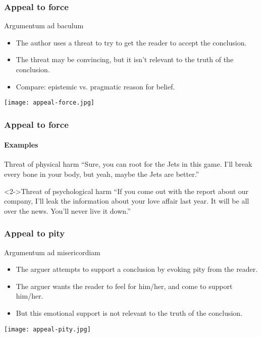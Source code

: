 \documentclass[10pt,letterpaper,xcolor=dvipsnames]{beamer}
\begin{document}
\begin{frame}
  \frametitle{Appeal to force}
  
  \begin{block}{Argumentum ad baculum}
    \begin{itemize}
      \item The author uses a threat to try to get the reader to accept the conclusion.
      \item The threat may be convincing, but it isn't relevant to the truth of the conclusion.
      \item Compare: epistemic vs. pragmatic reason for belief.
    \end{itemize}
  \end{block}
  
  
  \begin{center}
    \texttt{[image: appeal-force.jpg]}
  \end{center}
  
\end{frame}

\begin{frame}
  \frametitle{Appeal to force}
  \framesubtitle{Examples}
  
  \begin{block}{Threat of physical harm}
    ``Sure, you can root for the Jets in this game.  I'll break every bone in your body, but yeah, maybe the Jets are better.''
  \end{block}
  
  \begin{block}<2->{Threat of psychological harm}
    ``If you come out with the report about our company, I'll leak the information about your love affair last year.  It will be all over the news.  You'll never live it down.''
  \end{block}
  
\end{frame}

\begin{frame}
  \frametitle{Appeal to pity}
  
  \begin{block}{Argumentum ad misericordiam}
    \begin{itemize}
      \item The arguer attempts to support a conclusion by evoking pity from the reader.
      \item The arguer wants the reader to feel for him/her, and come to support him/her.
      \item But this emotional support is not relevant to the truth of the conclusion.
    \end{itemize}
  \end{block}
  
  \begin{center}
    \texttt{[image: appeal-pity.jpg]}
  \end{center}
  
\end{frame}
\end{document}
